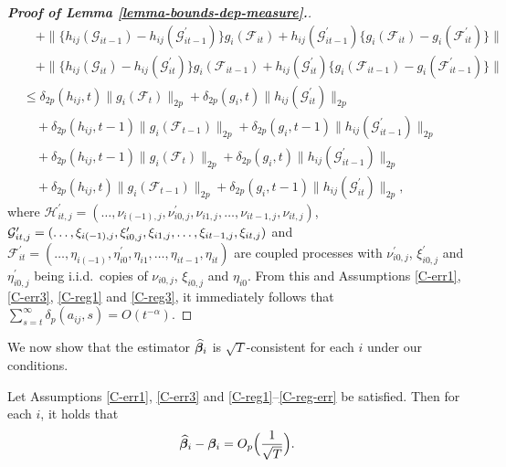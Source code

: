 \begin{proof}[\textnormal{\textbf{Proof of Lemma \ref{lemma-bounds-dep-measure}.}}]
\begin{align*}
 &\quad + \| \{ h_{ij}(\mathcal{G}_{it-1}) - h_{ij}(\mathcal{G}_{it-1}^\prime)\} g_i(\mathcal{F}_{it}) + h_{ij}(\mathcal{G}_{it-1}^\prime) \{g_i(\mathcal{F}_{it}) - g_i(\mathcal{F}_{it}^\prime)\} \| \\
 &\quad + \| \{ h_{ij}(\mathcal{G}_{it}) - h_{ij}(\mathcal{G}_{it}^\prime)\} g_i(\mathcal{F}_{it-1}) + h_{ij}(\mathcal{G}_{it}^\prime) \{g_i(\mathcal{F}_{it-1}) - g_i(\mathcal{F}_{it-1}^\prime)\} \| \\
 &\leq \delta_{2p}(h_{ij}, t) \| g_i(\mathcal{F}_t) \|_{2p} + \delta_{2p} (g_i, t) \| h_{ij}(\mathcal{G}_{it}^\prime) \|_{2p} \\
&\quad + \delta_{2p}(h_{ij}, t-1) \| g_i(\mathcal{F}_{t-1}) \|_{2p} + \delta_{2p} (g_i, t-1) \| h_{ij}(\mathcal{G}_{it-1}^\prime) \|_{2p} \\
&\quad + \delta_{2p}(h_{ij}, t-1) \| g_i(\mathcal{F}_t) \|_{2p} + \delta_{2p} (g_i, t) \| h_{ij}(\mathcal{G}_{it-1}^\prime) \|_{2p} \\
&\quad + \delta_{2p}(h_{ij}, t) \| g_i(\mathcal{F}_{t-1}) \|_{2p} + \delta_{2p} (g_i, t-1) \| h_{ij}(\mathcal{G}_{it}^\prime) \|_{2p}, 
\end{align*}
where $\mathcal{H}_{it,j}^\prime  = (\ldots, \nu_{i(-1),j}, \nu^\prime_{i0,j}, \nu_{i1,j}, \ldots, \nu_{it-1,j}, \nu_{it,j})$, $\mathcal{G}_{it,j}^\prime  = (\ldots, \xi_{i(-1),j}, \xi^\prime_{i0,j}, \xi_{i1,j}, \ldots, \linebreak \xi_{it-1,j}, \xi_{it,j})$ and $\mathcal{F}_{it}^\prime  = (\ldots, \eta_{i(-1)}, \eta^\prime_{i0}, \eta_{i1}, \ldots, \eta_{it-1}, \eta_{it})$ are coupled processes with $\nu_{i0,j}^\prime$, $\xi_{i0,j}^\prime$ and $\eta_{i0,j}^\prime$ being i.i.d.\ copies of $\nu_{i0,j}$, $\xi_{i0,j}$ and $\eta_{i0}$. From this and Assumptions \ref{C-err1}, \ref{C-err3}, \ref{C-reg1} and \ref{C-reg3}, it immediately follows that $\sum_{s=t}^\infty \delta_p(a_{ij}, s) = O(t^{-\alpha})$.
\end{proof}


We now show that the estimator $\widehat{\bm{\beta}}_i$ is $\sqrt{T}$-consistent for each $i$ under our conditions.


\begin{lemmaA}\label{lemma-beta-rate}
Let Assumptions \ref{C-err1}, \ref{C-err3} and \ref{C-reg1}--\ref{C-reg-err} be satisfied. Then for each $i$, it holds that
\[ \widehat{\bm{\beta}}_i - \bm{\beta}_i = O_p\Big(\frac{1}{\sqrt{T}}\Big). \]
\end{lemmaA}


